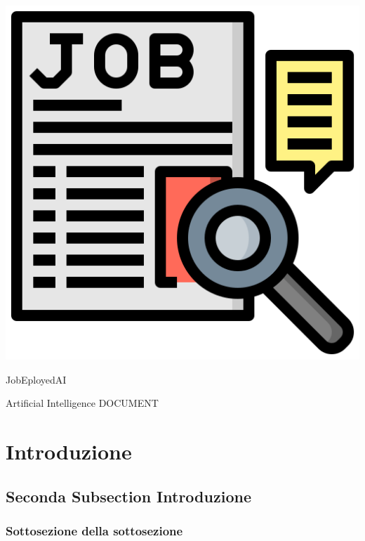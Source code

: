 \documentclass{article}
\begin{document}
\thispagestyle{empty}

\begin{center}%
    \includegraphics[scale=0.5]{job_seeking.png}

    \vspace{1cm}

    {\huge{JobEployedAI}} %

    \vspace{0.5cm}

    {\large Artificial Intelligence DOCUMENT}
\end{center}

\newpage %

\tableofcontents

\newpage

\section{Introduzione}
\lipsum[3]
\lipsum[2]


\subsection{Seconda Subsection Introduzione}
\lipsum[1-3] %

\subsubsection{Sottosezione della sottosezione}
\lipsum[1]
\end{document}
